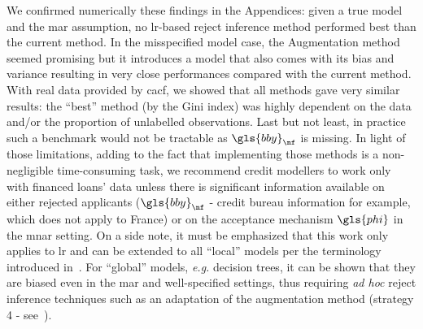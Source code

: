 We confirmed numerically these findings in the Appendices: given a true model and the \gls{mar} assumption, no \gls{lr}-based {reject inference} method performed best than the current method. In the misspecified model case, the Augmentation method seemed promising but it introduces a model that also comes with its bias and variance resulting in very close performances compared with the current method. With real data provided by \gls{cacf}, we showed that all methods gave very similar results: the ``best'' method (by the Gini index) was highly dependent on the data and/or the proportion of unlabelled observations. Last but not least, in practice such a benchmark would not be tractable as $\gls{bby}_{\nf}$ is missing. In light of those limitations, adding to the fact that implementing those methods is a non-negligible time-consuming task, we recommend credit modellers to work only with financed loans' data unless there is significant information available on either rejected applicants ($\gls{bby}_{\nf}$ - credit bureau information for example, which does not apply to France) or on the acceptance mechanism $\gls{phi}$ in the \gls{mnar} setting. On a side note, it must be emphasized that this work only applies to \gls{lr} and can be extended to all ``local'' models per the terminology introduced in~\cite{zadrozny2004learning}. For ``global'' models, \textit{e.g.} decision trees, it can be shown that they are biased even in the \gls{mar} and well-specified settings, thus requiring \textit{ad hoc} reject inference techniques such as an adaptation of the augmentation method (strategy 4 - see~\cite{zadrozny2004learning}).

\printbibliography[heading=subbibliography, title=References of Chapter 2]
